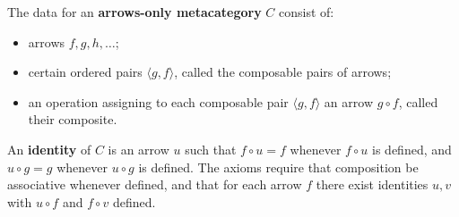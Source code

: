 The data for an \textbf{arrows-only metacategory} $C$ consist of:
\begin{itemize}
\item arrows $f, g, h, \ldots$;
\item certain ordered pairs $\langle g, f \rangle$, called the composable pairs of arrows;
\item an operation assigning to each composable pair $\langle g, f \rangle$ an arrow $g \circ f$, called their composite.
\end{itemize}
An \textbf{identity} of $C$ is an arrow $u$ such that $f \circ u = f$ whenever $f \circ u$ is defined, and $u \circ g = g$ whenever $u \circ g$ is defined. The axioms require that composition be associative whenever defined, and that for each arrow $f$ there exist identities $u, v$ with $u \circ f$ and $f \circ v$ defined.
